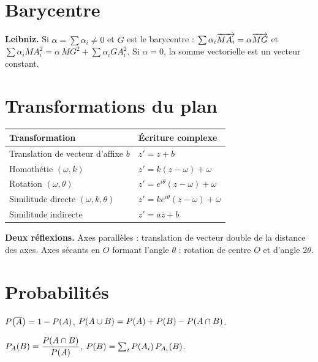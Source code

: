 \section*{Barycentre}

\noindent
\textbf{Leibniz.} Si $\alpha = \sum \alpha_{i} \neq 0$ et $G$ est le
barycentre :
$\sum \alpha_{i}\vect{MA_{i}} = \alpha\vect{MG}$ et
$\sum \alpha_{i}MA_{i}^{2} = \alpha\,MG^{2}+\sum \alpha_{i}GA_{i}^{2}$.
Si $\alpha = 0$, la somme vectorielle est un vecteur constant.

\section*{Transformations du plan}

\begin{center}
\setlength{\tabcolsep}{10pt}
\renewcommand{\arraystretch}{1.5}
\begin{tabular}{@{}ll@{}}
\toprule
Transformation & Écriture complexe \\
\midrule
Translation de vecteur d'affixe $b$ & $z' = z+b$ \\
Homothétie $(\omega,k)$ & $z' = k(z-\omega)+\omega$ \\
Rotation $(\omega,\theta)$ &
  $z' = e^{i\theta}(z-\omega)+\omega$ \\
Similitude directe $(\omega,k,\theta)$ &
  $z' = ke^{i\theta}(z-\omega)+\omega$ \\
Similitude indirecte & $z' = a\overline z+b$ \\
\bottomrule
\end{tabular}
\end{center}

\noindent
\textbf{Deux réflexions.} Axes parallèles : translation de vecteur double de
la distance des axes. Axes sécants en $O$ formant l'angle $\theta$ :
rotation de centre $O$ et d'angle $2\theta$.

\section*{Probabilités}

\noindent
$\proba{\evtc{A}} = 1-\proba{A}$, \quad
$\proba{A \cup B} = \proba{A}+\proba{B}-\proba{A \cap B}$.

\smallskip
\noindent
$\probacond{B}{A} = \dfrac{\proba{A \cap B}}{\proba{A}}$, \quad
$\proba{B} = \sum_{i}\proba{A_{i}}\probacond{B}{A_{i}}$.

